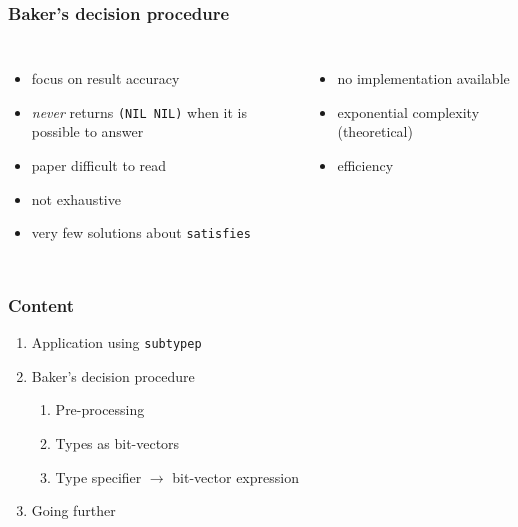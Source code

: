 \documentclass[aspectratio=169]{beamer}
\renewcommand\code[1]{\texttt{#1}}
\newcommand\rarr{\ensuremath{\rightarrow}}
\newcommand\plus{{\color{watchOS-blue}\faPlus}}
\newcommand\minus{{\color{watchOS-red}\faMinus}}
\newcommand\maybe{{\color{watchOS-purple}\faQuestion}}
\begin{document}
\begin{frame}
  \frametitle{Baker's decision procedure}
  \begin{columns}
    \column{.45\paperwidth}
    \begin{itemize}
    \item[\plus] focus on result accuracy
    \item[\plus] \emph{never} returns \code{(NIL NIL)} when it is possible to
      answer
      \pause
    \item[\minus] paper difficult to read
    \item[\minus] not exhaustive
    \item[\minus] very few solutions about \code{satisfies}
    \end{itemize}

    \pause
    \column{.45\paperwidth}
    \begin{itemize}
    \item[\minus] no implementation available
    \item[\minus] exponential complexity (theoretical)
    \item[\maybe] efficiency%
    \end{itemize}
  \end{columns}
\end{frame}

\begin{frame}
  \frametitle{Content}
  \begin{enumerate}
    \bf
    \setlength\itemsep{1em}
  \item Application using \code{subtypep}
  \item Baker's decision procedure
    \begin{enumerate}
      \setlength\itemsep{.5em}
      \it
    \item Pre-processing
    \item Types as bit-vectors
    \item Type specifier \rarr{} bit-vector expression
    \end{enumerate}
  \item Going further
  \end{enumerate}
\end{frame}

\end{document}
